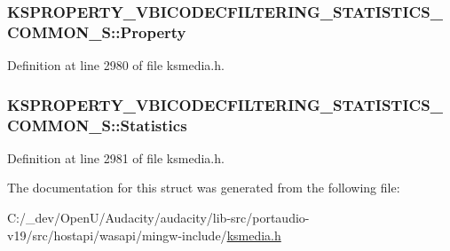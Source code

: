 \subsubsection[{\texorpdfstring{Property}{Property}}]{ K\+S\+P\+R\+O\+P\+E\+R\+T\+Y\+\_\+\+V\+B\+I\+C\+O\+D\+E\+C\+F\+I\+L\+T\+E\+R\+I\+N\+G\+\_\+\+S\+T\+A\+T\+I\+S\+T\+I\+C\+S\+\_\+\+C\+O\+M\+M\+O\+N\+\_\+\+S\+::\+Property}\hypertarget{struct_k_s_p_r_o_p_e_r_t_y___v_b_i_c_o_d_e_c_f_i_l_t_e_r_i_n_g___s_t_a_t_i_s_t_i_c_s___c_o_m_m_o_n___s_a3499fb79f45d987b107923dd9014a00c}{}\label{struct_k_s_p_r_o_p_e_r_t_y___v_b_i_c_o_d_e_c_f_i_l_t_e_r_i_n_g___s_t_a_t_i_s_t_i_c_s___c_o_m_m_o_n___s_a3499fb79f45d987b107923dd9014a00c}


Definition at line 2980 of file ksmedia.\+h.

\subsubsection[{\texorpdfstring{Statistics}{Statistics}}]{ K\+S\+P\+R\+O\+P\+E\+R\+T\+Y\+\_\+\+V\+B\+I\+C\+O\+D\+E\+C\+F\+I\+L\+T\+E\+R\+I\+N\+G\+\_\+\+S\+T\+A\+T\+I\+S\+T\+I\+C\+S\+\_\+\+C\+O\+M\+M\+O\+N\+\_\+\+S\+::\+Statistics}\hypertarget{struct_k_s_p_r_o_p_e_r_t_y___v_b_i_c_o_d_e_c_f_i_l_t_e_r_i_n_g___s_t_a_t_i_s_t_i_c_s___c_o_m_m_o_n___s_aef7eebc70772cd0614967f36195f45b7}{}\label{struct_k_s_p_r_o_p_e_r_t_y___v_b_i_c_o_d_e_c_f_i_l_t_e_r_i_n_g___s_t_a_t_i_s_t_i_c_s___c_o_m_m_o_n___s_aef7eebc70772cd0614967f36195f45b7}


Definition at line 2981 of file ksmedia.\+h.



The documentation for this struct was generated from the following file\+:\begin{DoxyCompactItemize}
\item 
C\+:/\+\_\+dev/\+Open\+U/\+Audacity/audacity/lib-\/src/portaudio-\/v19/src/hostapi/wasapi/mingw-\/include/\hyperlink{ksmedia_8h}{ksmedia.\+h}\end{DoxyCompactItemize}
